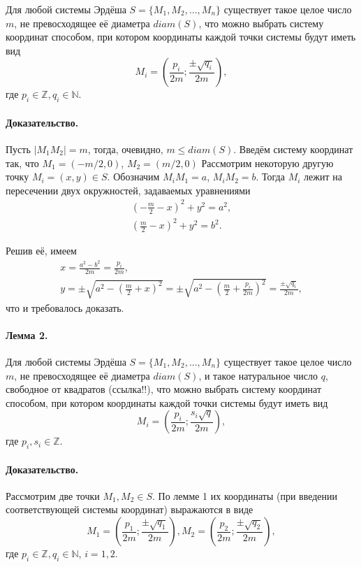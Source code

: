 \documentclass[a4paper,14pt]{article} %
\begin{document}
Для любой системы Эрдёша $S=\{M_1, M_2, ..., M_n\}$ существует такое целое число $m$, не превосходящее её диаметра $diam(S)$,
что можно выбрать систему координат способом, при котором координаты каждой точки системы будут иметь вид
\begin{equation}
	M_i = \left(
		\frac{p_i}{2m}
		;
		\frac{\pm\sqrt{q_i}}{2m}
	\right),
\end{equation}
где $p_i \in \mathbb{Z}, q_i \in \mathbb{N}$.


\paragraph{Доказательство.}
Пусть $|M_1 M_2| = m$, тогда, очевидно, $m \leq diam(S)$.
Введём систему координат так, что $M_1=(-m/2, 0)$, $M_2=(m/2, 0)$
Рассмотрим некоторую другую точку $M_i=(x, y)\in S$.
Обозначим $M_i M_1 = a$, $M_i M_2 = b$.
Тогда $M_i$ лежит на пересечении двух окружностей,
задаваемых уравнениями
\begin{gather}
	\left(-\frac{m}{2} - x\right)^2 + y ^2 = a^2,
\\
	\left( \frac{m}{2} - x\right)^2 + y ^2 = b^2.
\end{gather}

Решив её, имеем
\begin{gather}
	x = \frac{a^2 - b^2}{2 m} = \frac{p_i}{2m},
\\
	y = \pm\sqrt{a^2 - \left(\frac{m}{2}+x\right)^2} =
	\pm\sqrt{a^2 - \left(\frac{m}{2}+\frac{p_i}{2m}\right)^2} =
	\frac{\pm\sqrt{q_i}}{2m},
\end{gather}
что и требовалось доказать.

\paragraph{Лемма 2.}

Для любой системы Эрдёша $S=\{M_1, M_2, ..., M_n\}$ существует такое целое число $m$, не превосходящее её диаметра $diam(S)$,
и такое натуральное число $q$, свободное от квадратов (ссылка!!),
что можно выбрать систему координат способом, при котором координаты каждой точки системы будут иметь вид
\begin{equation}
	M_i = \left(
		\frac{p_i}{2m}
		;
		\frac{s_i\sqrt{q}}{2m}
	\right),
\end{equation}
где $p_i, s_i \in \mathbb{Z}$.

\paragraph{Доказательство.}
Рассмотрим две точки $M_1, M_2 \in S$.
По лемме 1 их координаты (при введении соответствующей системы координат) выражаются в виде
\begin{equation}
	M_1 = \left(
		\frac{p_1}{2m}
		;
		\frac{\pm\sqrt{q_1}}{2m}
	\right),
	M_2 = \left(
		\frac{p_2}{2m}
		;
		\frac{\pm\sqrt{q_2}}{2m}
	\right),
\end{equation}
где $p_i \in \mathbb{Z}, q_i \in \mathbb{N}$, $i=1,2$.
\end{document}
